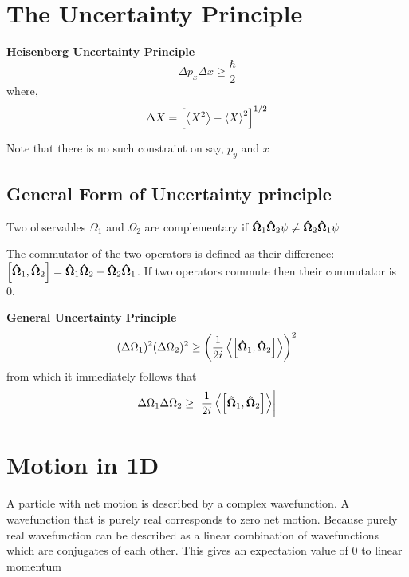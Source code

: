 \documentclass[11pt]{article}
\theoremstyle{definition}
\begin{document}
\section{The Uncertainty Principle}
\begin{shaded}
\textbf{Heisenberg Uncertainty Principle}
\begin{equation*}
    \Delta p_x \Delta x \geq \frac{\hbar}{2}
\end{equation*}
where,
\begin{gather*}
     \Delta X = \left[\expval{X^2} - \expval{X}^2 \right]^{1/2}
\end{gather*}

Note that there is no such constraint on say, $p_y$ and $x$
\end{shaded}

\subsection{General Form of Uncertainty principle}

Two observables $\Omega_1$ and $\Omega_2$ are complementary if $\vectorunit{\Omega}_1 \vectorunit{\Omega}_2 \psi \neq  \vectorunit{\Omega}_2 \vectorunit{\Omega}_1 \psi$

The commutator of the two operators is defined as their difference: $\comm{\vectorunit{\Omega}_1}{\vectorunit{\Omega}_2} = \vectorunit{\Omega}_1\vectorunit{\Omega}_2 - \vectorunit{\Omega}_2\vectorunit{\Omega}_1$. If two operators commute then their commutator is 0.

\begin{shaded}
\textbf{General Uncertainty Principle}
\begin{equation*}
    (\Delta \Omega_1)^2 (\Delta \Omega_2)^2 \geq \left(\frac{1}{2i}\expval{ \comm{\vectorunit{\Omega}_1}{\vectorunit{\Omega}_2}}\right)^2
\end{equation*}
from which it immediately follows that
\begin{equation*}
    \Delta \Omega_1 \Delta \Omega_2 \geq \abs{\frac{1}{2i} \expval{ \comm{\vectorunit{\Omega}_1}{\vectorunit{\Omega}_2}}}
\end{equation*}
\end{shaded}




\section{Motion in 1D}

A particle with net motion is described by a complex wavefunction. A wavefunction that is purely real corresponds to zero net motion. Because purely real wavefunction can be described as a linear combination of wavefunctions which are conjugates of each other. This gives an expectation value of 0 to linear momentum
\end{document}
